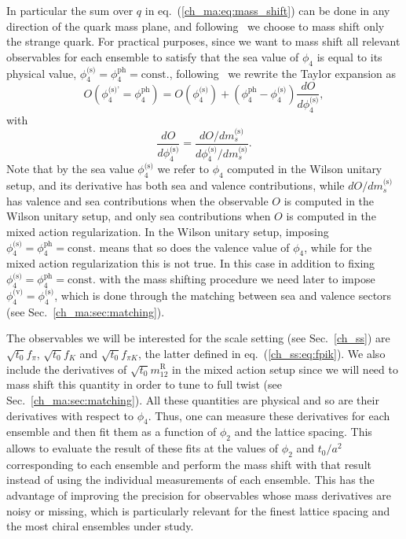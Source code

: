 In particular the sum over $q$ in eq.~(\ref{ch_ma:eq:mass_shift}) can be done in any direction of the quark mass plane, and following~\citep{Strassberger:2021tsu} we choose to mass shift only the strange quark. For practical purposes, since we want to mass shift all relevant observables for each ensemble to satisfy that the sea value of $\phi_4$ is equal to its physical value, $\phi_4^{\textrm{(s)}}=\phi_4^{\textrm{ph}}={\textrm{const.}}$, following~\citep{Strassberger:2023xnj} we rewrite the Taylor expansion as
\begin{equation}
{O}\left(\phi_4^{\textrm{(s)'}}=\phi_4^{\textrm{ph}}\right)={O}\left(\phi_4^{\textrm{(s)}}\right)+\left(\phi_4^{\textrm{ph}}-\phi_4^{\textrm{(s)}}\right)\frac{d{O}}{d\phi_4^{\textrm{(s)}}},
\end{equation}
with
\begin{equation}
\frac{d{O}}{d\phi_4^{\textrm{(s)}}}=\frac{d{O}/dm_s^{\textrm{(s)}}}{d\phi_4^{\textrm{(s)}}/dm_s^{\textrm{(s)}}}.
\end{equation}
Note that by the sea value $\phi_4^{\textrm{(s)}}$ we refer to $\phi_4$ computed in the Wilson unitary setup, and its derivative has both sea and valence contributions, while $d{O}/dm_s^{\textrm{(s)}}$ has valence and sea contributions when the observable ${O}$ is computed in the Wilson unitary setup, and only sea contributions when ${O}$ is computed in the mixed action regularization. In the Wilson unitary setup, imposing $\phi_4^{\textrm{(s)}}=\phi_4^{\textrm{ph}}={\textrm{const.}}$ means that so does the valence value of $\phi_4$, while for the mixed action regularization this is not true. In this case in addition to fixing $\phi_4^{\textrm{(s)}}=\phi_4^{\textrm{ph}}={\textrm{const.}}$ with the mass shifting procedure we need later to impose $\phi_4^{\textrm{(v)}}=\phi_4^{\textrm{(s)}}$, which is done through the matching between sea and valence sectors (see Sec.~\ref{ch_ma:sec:matching}).

The observables we will be interested for the scale setting (see Sec.~\ref{ch_ss}) are $\sqrt{t_0}f_{\pi}$, $\sqrt{t_0}f_{K}$ and $\sqrt{t_0}f_{\pi K}$, the latter defined in eq.~(\ref{ch_ss:eq:fpik}). We also include the derivatives of $\sqrt{t_0}m_{12}^{\textrm{R}}$ in the mixed action setup since we will need to mass shift this quantity in order to tune to full twist (see Sec.~\ref{ch_ma:sec:matching}). All these quantities are physical and so are their derivatives with respect to $\phi_4$. Thus, one can measure these derivatives for each ensemble and then fit them as a function of $\phi_2$ and the lattice spacing. This allows to evaluate the result of these fits at the values of $\phi_2$ and $t_0/a^2$ corresponding to each ensemble and perform the mass shift with that result instead of using the individual measurements of each ensemble. This has the advantage of improving the precision for observables whose mass derivatives are noisy or missing, which is particularly relevant for the finest lattice spacing and the most chiral ensembles under study.

